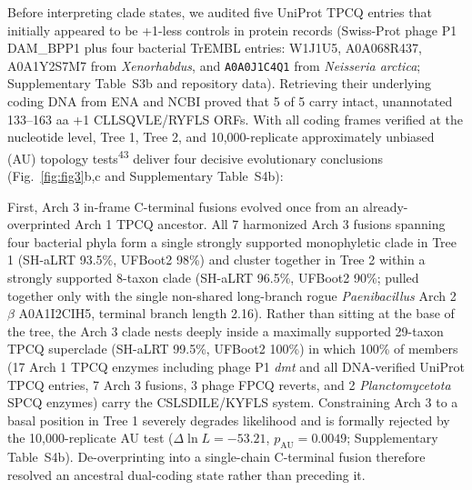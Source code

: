 \documentclass[10pt,letterpaper]{article}
\newcommand{\spname}[1]{\textit{#1}}
\newcommand{\gene}[1]{\textit{#1}}
\newcommand{\refsup}[1]{\textsuperscript{#1}}
\begin{document}
Before interpreting clade states, we audited five UniProt TPCQ entries that initially appeared to be +1-less controls in protein records (Swiss-Prot phage P1 DAM\_BPP1 plus four bacterial TrEMBL entries: W1J1U5, A0A068R437, A0A1Y2S7M7 from \spname{Xenorhabdus}, and \texttt{A0A0J1C4Q1} from \spname{Neisseria arctica}; Supplementary Table~S3b and repository data). Retrieving their underlying coding DNA from ENA and NCBI proved that 5 of 5 carry intact, unannotated 133--163 aa +1 CLLSQVLE/RYFLS ORFs. With all coding frames verified at the nucleotide level, Tree 1, Tree 2, and 10,000-replicate approximately unbiased (AU) topology tests\refsup{43} deliver four decisive evolutionary conclusions (Fig.~\ref{fig:fig3}b,c and Supplementary Table~S4b):

First, Arch 3 in-frame C-terminal fusions evolved once from an already-overprinted Arch 1 TPCQ ancestor. All 7 harmonized Arch 3 fusions spanning four bacterial phyla form a single strongly supported monophyletic clade in Tree 1 (SH-aLRT 93.5\%, UFBoot2 98\%) and cluster together in Tree 2 within a strongly supported 8-taxon clade (SH-aLRT 96.5\%, UFBoot2 90\%; pulled together only with the single non-shared long-branch rogue \spname{Paenibacillus} Arch 2 $\beta$ A0A1I2CIH5, terminal branch length 2.16). Rather than sitting at the base of the tree, the Arch 3 clade nests deeply inside a maximally supported 29-taxon TPCQ superclade (SH-aLRT 99.5\%, UFBoot2 100\%) in which 100\% of members (17 Arch 1 TPCQ enzymes including phage P1 \gene{dmt} and all DNA-verified UniProt TPCQ entries, 7 Arch 3 fusions, 3 phage FPCQ reverts, and 2 \spname{Planctomycetota} SPCQ enzymes) carry the CSLSDILE/KYFLS system. Constraining Arch 3 to a basal position in Tree 1 severely degrades likelihood and is formally rejected by the 10,000-replicate AU test ($\Delta\ln L = -53.21$, $p_{\mathrm{AU}} = 0.0049$; Supplementary Table~S4b). De-overprinting into a single-chain C-terminal fusion therefore resolved an ancestral dual-coding state rather than preceding it.
\end{document}
